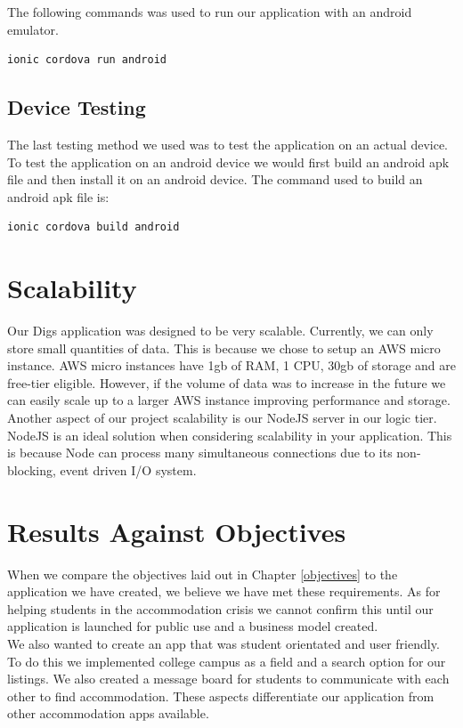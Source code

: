 \noindent The following commands was used to run our application with an android emulator.

\begin{verbatim}
ionic cordova run android
\end{verbatim}

\subsection{Device Testing}
The last testing method we used was to test the application on an actual device. To test the application on an android device we would first build an android apk file and then install it on an android device. The command used to build an android apk file is:

\begin{verbatim}
ionic cordova build android
\end{verbatim}

\section{Scalability}
Our Digs application was designed to be very scalable. Currently, we can only store small quantities of data. This is because we chose to setup an AWS micro instance. AWS micro instances have 1gb of RAM, 1 CPU, 30gb of storage and are free-tier eligible. However, if the volume of data was to increase in the future we can easily scale up to a larger AWS instance improving performance and storage.\\

\noindent Another aspect of our project scalability is our NodeJS server in our logic tier. NodeJS is an ideal solution when considering scalability in your application. This is because Node can process many simultaneous connections due to its non-blocking, event driven I/O system.

\section{Results Against Objectives}
When we compare the objectives laid out in Chapter \ref{objectives} to the application we have created, we believe we have met these requirements. As for helping students in the accommodation crisis we cannot confirm this until our application is launched for public use and a business model created. \\

\noindent We also wanted to create an app that was student orientated and user friendly. To do this we implemented college campus as a field and a search option for our listings. We also created a message board for students to communicate with each other to find accommodation. These aspects differentiate our application from other accommodation apps available. 


